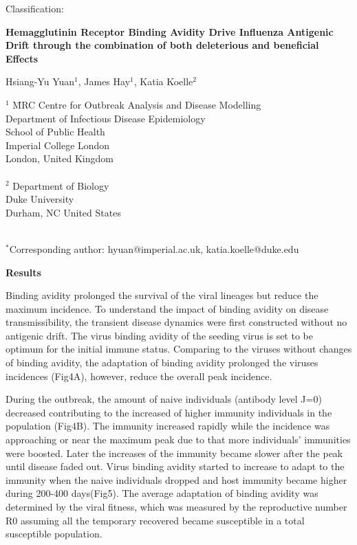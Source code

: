 \documentclass[12pt,a4paper]{article}
\begin{document}
Classification: 

\large {\bf Hemagglutinin Receptor Binding Avidity Drive Influenza Antigenic Drift through the combination of both deleterious and beneficial Effects} \normalsize

Hsiang-Yu Yuan$^{1}$, James Hay$^{1}$, Katia Koelle$^{2}$

\begin{tabbing}
$^1$ 	\= MRC Centre for Outbreak Analysis and Disease Modelling \\
		\> Department of Infectious Disease Epidemiology \\
		\> School of Public Health \\
		\> Imperial College London \\
		\> London, United Kingdom \\ \\
		
$^2$ 	\> Department of Biology \\
        \> Duke University \\
        \> Durham, NC United States \\ \\
		

\end{tabbing}
\doublespacing
$^*$Corresponding author: hyuan@imperial.ac.uk, katia.koelle@duke.edu 
\clearpage


{\bf Results}



 
Binding avidity prolonged the survival of the viral lineages but reduce the maximum incidence. To understand the impact of binding avidity on disease transmissibility, the transient disease dynamics were first constructed without no antigenic drift. The virus binding avidity of the seeding virus is set to be optimum for the initial immune status. Comparing to the viruses without changes of binding avidity, the adaptation of binding avidity prolonged the viruses incidences (Fig4A), however, reduce the overall peak incidence.


During the outbreak, the amount of naive individuals (antibody level J=0) decreased contributing to the increased of higher immunity individuals in the population (Fig4B). The immunity increased rapidly while the incidence was approaching or near the maximum peak due to that more individuals' immunities were boosted. Later the increases of the immunity became slower after the peak until disease faded out. Virus binding avidity started to increase to adapt to the immunity when the naive individuals dropped and host immunity became higher during 200-400 days(Fig5). The average adaptation of binding avidity was determined by the viral fitness, which was measured by the reproductive number R0 assuming all the temporary recovered became susceptible in a total susceptible population. 
\end{document}
